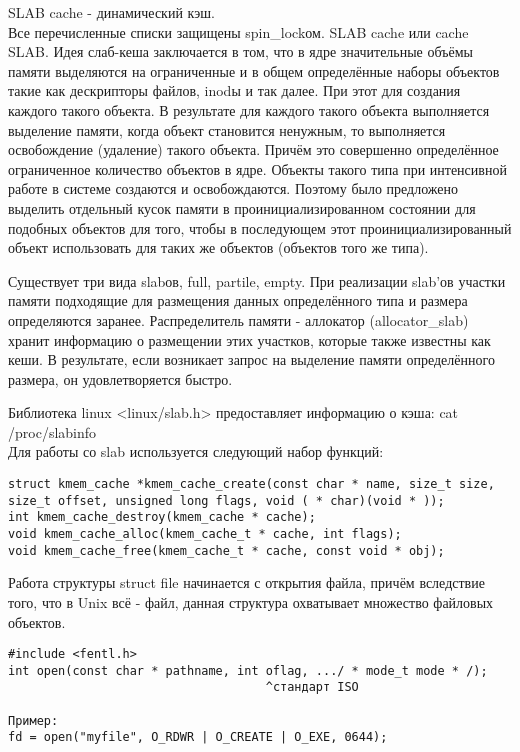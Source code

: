 SLAB cache - динамический кэш.\\

Все перечисленные списки защищены spin\_lockом. SLAB cache или cache SLAB. Идея слаб-кеша заключается в том, что в ядре значительные объёмы памяти выделяются на ограниченные и в общем определённые наборы объектов такие как дескрипторы файлов, inodы и так далее. При этот для создания каждого такого объекта. В результате для каждого такого объекта выполняется выделение памяти, когда объект становится ненужным, то выполняется освобождение (удаление) такого объекта. Причём это совершенно определённое ограниченное количество объектов в ядре. Объекты такого типа при интенсивной работе в системе создаются и освобождаются. Поэтому было предложено выделить отдельный кусок памяти в проинициализированном состоянии для подобных объектов для того, чтобы в последующем этот проинициализированный объект использовать для таких же объектов (объектов того же типа). 

\begin{figure}[H]
	\center{\texttt{[image: -8]}}
\end{figure}

Существует три вида slabов, full, partile, empty. При реализации slab'ов участки памяти подходящие для размещения данных определённого типа и размера определяются заранее. Распределитель памяти - аллокатор (allocator\_slab) хранит информацию о размещении этих участков, которые также известны как кеши. В результате, если возникает запрос на выделение памяти определённого размера, он удовлетворяется быстро.

Библиотека linux <linux/slab.h> предоставляет информацию о кэша: cat /proc/slabinfo\\

Для работы со slab используется следующий набор функций:\\
\begin{lstlisting}
struct kmem_cache *kmem_cache_create(const char * name, size_t size, size_t offset, unsigned long flags, void ( * char)(void * ));
int kmem_cache_destroy(kmem_cache * cache);
void kmem_cache_alloc(kmem_cache_t * cache, int flags);
void kmem_cache_free(kmem_cache_t * cache, const void * obj);
\end{lstlisting}

Работа структуры struct file начинается с открытия файла, причём вследствие того, что в Unix всё - файл, данная структура охватывает множество файловых объектов.

\begin{lstlisting}
#include <fentl.h>
int open(const char * pathname, int oflag, .../ * mode_t mode * /);
									^стандарт ISO

Пример:
fd = open("myfile", O_RDWR | O_CREATE | O_EXE, 0644); 
\end{lstlisting}


